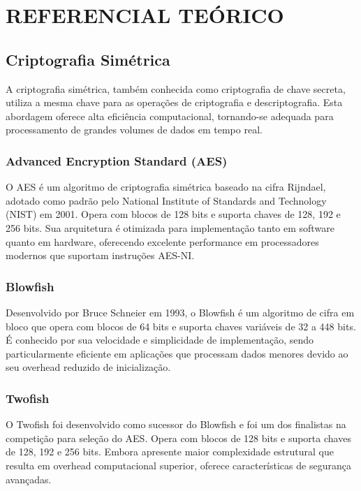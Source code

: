 \documentclass[12pt,a4paper,oneside]{article}
\begin{document}
\section{REFERENCIAL TEÓRICO}

\subsection{Criptografia Simétrica}

A criptografia simétrica, também conhecida como criptografia de chave secreta, utiliza a mesma chave para as operações de criptografia e descriptografia. Esta abordagem oferece alta eficiência computacional, tornando-se adequada para processamento de grandes volumes de dados em tempo real.

\subsubsection{Advanced Encryption Standard (AES)}

O AES é um algoritmo de criptografia simétrica baseado na cifra Rijndael, adotado como padrão pelo National Institute of Standards and Technology (NIST) em 2001. Opera com blocos de 128 bits e suporta chaves de 128, 192 e 256 bits. Sua arquitetura é otimizada para implementação tanto em software quanto em hardware, oferecendo excelente performance em processadores modernos que suportam instruções AES-NI.

\subsubsection{Blowfish}

Desenvolvido por Bruce Schneier em 1993, o Blowfish é um algoritmo de cifra em bloco que opera com blocos de 64 bits e suporta chaves variáveis de 32 a 448 bits. É conhecido por sua velocidade e simplicidade de implementação, sendo particularmente eficiente em aplicações que processam dados menores devido ao seu overhead reduzido de inicialização.

\subsubsection{Twofish}

O Twofish foi desenvolvido como sucessor do Blowfish e foi um dos finalistas na competição para seleção do AES. Opera com blocos de 128 bits e suporta chaves de 128, 192 e 256 bits. Embora apresente maior complexidade estrutural que resulta em overhead computacional superior, oferece características de segurança avançadas.
\end{document}
